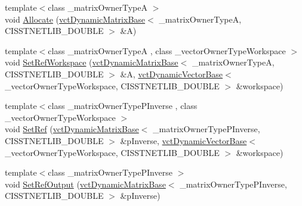 \begin{DoxyCompactItemize}
\item 
{\footnotesize template$<$class \+\_\+matrix\+Owner\+Type\+A $>$ }\\void \hyperlink{classnmr_p_inverse_dynamic_data_aa37d3d41feecd5c89a8e77192230ab9a}{Allocate} (\hyperlink{classvct_dynamic_matrix_base}{vct\+Dynamic\+Matrix\+Base}$<$ \+\_\+matrix\+Owner\+Type\+A, C\+I\+S\+S\+T\+N\+E\+T\+L\+I\+B\+\_\+\+D\+O\+U\+B\+L\+E $>$ \&A)
\item 
{\footnotesize template$<$class \+\_\+matrix\+Owner\+Type\+A , class \+\_\+vector\+Owner\+Type\+Workspace $>$ }\\void \hyperlink{classnmr_p_inverse_dynamic_data_a29684ce8c84265d7e2c9d5133f39cd15}{Set\+Ref\+Workspace} (\hyperlink{classvct_dynamic_matrix_base}{vct\+Dynamic\+Matrix\+Base}$<$ \+\_\+matrix\+Owner\+Type\+A, C\+I\+S\+S\+T\+N\+E\+T\+L\+I\+B\+\_\+\+D\+O\+U\+B\+L\+E $>$ \&A, \hyperlink{classvct_dynamic_vector_base}{vct\+Dynamic\+Vector\+Base}$<$ \+\_\+vector\+Owner\+Type\+Workspace, C\+I\+S\+S\+T\+N\+E\+T\+L\+I\+B\+\_\+\+D\+O\+U\+B\+L\+E $>$ \&workspace)
\item 
{\footnotesize template$<$class \+\_\+matrix\+Owner\+Type\+P\+Inverse , class \+\_\+vector\+Owner\+Type\+Workspace $>$ }\\void \hyperlink{classnmr_p_inverse_dynamic_data_a002d887ccce780a84cf53c689f537004}{Set\+Ref} (\hyperlink{classvct_dynamic_matrix_base}{vct\+Dynamic\+Matrix\+Base}$<$ \+\_\+matrix\+Owner\+Type\+P\+Inverse, C\+I\+S\+S\+T\+N\+E\+T\+L\+I\+B\+\_\+\+D\+O\+U\+B\+L\+E $>$ \&p\+Inverse, \hyperlink{classvct_dynamic_vector_base}{vct\+Dynamic\+Vector\+Base}$<$ \+\_\+vector\+Owner\+Type\+Workspace, C\+I\+S\+S\+T\+N\+E\+T\+L\+I\+B\+\_\+\+D\+O\+U\+B\+L\+E $>$ \&workspace)
\item 
{\footnotesize template$<$class \+\_\+matrix\+Owner\+Type\+P\+Inverse $>$ }\\void \hyperlink{classnmr_p_inverse_dynamic_data_a84d5d2005be7dde90b725b18589439d1}{Set\+Ref\+Output} (\hyperlink{classvct_dynamic_matrix_base}{vct\+Dynamic\+Matrix\+Base}$<$ \+\_\+matrix\+Owner\+Type\+P\+Inverse, C\+I\+S\+S\+T\+N\+E\+T\+L\+I\+B\+\_\+\+D\+O\+U\+B\+L\+E $>$ \&p\+Inverse)
\end{DoxyCompactItemize}
